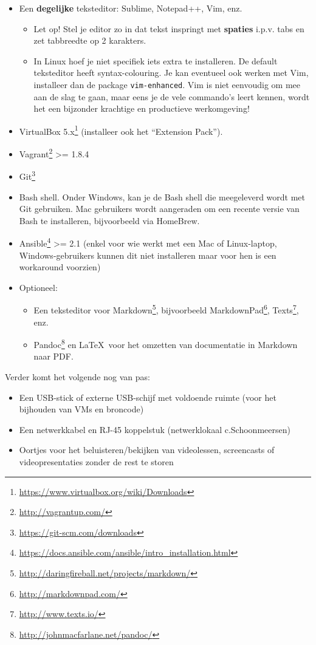 \begin{itemize}
\item Een \textbf{degelijke} teksteditor: Sublime, Notepad++, Vim, enz.
  \begin{itemize}
  \item Let op! Stel je editor zo in dat tekst inspringt met \textbf{spaties} i.p.v. tabs en zet tabbreedte op 2 karakters.
  \item In Linux hoef je niet specifiek iets extra te installeren. De default teksteditor heeft syntax-colouring. Je kan eventueel ook werken met Vim, installeer dan de package \texttt{vim-enhanced}. Vim is niet eenvoudig om mee aan de slag te gaan, maar eens je de vele commando's leert kennen, wordt het een bijzonder krachtige en productieve werkomgeving!
  \end{itemize}
\item VirtualBox 5.x\footnote{\url{https://www.virtualbox.org/wiki/Downloads}} (installeer ook het ``Extension Pack'').
\item Vagrant\footnote{\url{http://vagrantup.com/}} \textgreater{}= 1.8.4
\item Git\footnote{\url{https://git-scm.com/downloads}}
\item Bash shell. Onder Windows, kan je de Bash shell die meegeleverd wordt met Git gebruiken. Mac gebruikers wordt aangeraden om een recente versie van Bash te installeren, bijvoorbeeld via HomeBrew.
\item Ansible\footnote{\url{https://docs.ansible.com/ansible/intro_installation.html}} \textgreater{}= 2.1 (enkel voor wie werkt met een Mac of Linux-laptop, Windows-gebruikers kunnen dit niet installeren maar voor hen is een workaround voorzien)
\item Optioneel:

  \begin{itemize}
    \item Een teksteditor voor Markdown\footnote{\url{http://daringfireball.net/projects/markdown/}}, bijvoorbeeld MarkdownPad\footnote{\url{http://markdownpad.com/}}, Texts\footnote{\url{http://www.texts.io/}}, enz.
  \item Pandoc\footnote{\url{http://johnmacfarlane.net/pandoc/}} en \LaTeX\ voor het
    omzetten van documentatie in Markdown naar PDF.
  \end{itemize}
\end{itemize}

Verder komt het volgende nog van pas:

\begin{itemize}
\item Een USB-stick of externe USB-schijf met voldoende ruimte (voor het bijhouden van VMs en broncode)
\item Een netwerkkabel en RJ-45 koppelstuk (netwerklokaal c.Schoonmeersen)
\item Oortjes voor het beluisteren/bekijken van videolessen, screencasts of videopresentaties zonder de rest te storen
\end{itemize}

